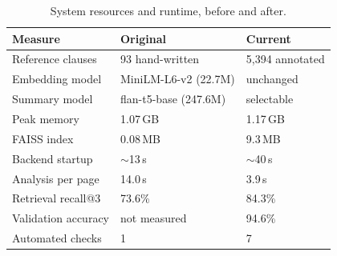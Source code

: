 \begin{table}[!t]
\centering
\caption{System resources and runtime, before and after.}
\label{tab:resources}
\footnotesize
\begin{tabular}{lll}
\toprule
Measure & Original & Current \\
\midrule
Reference clauses & 93 hand-written & 5,394 annotated \\
Embedding model & MiniLM-L6-v2 (22.7M) & unchanged \\
Summary model & flan-t5-base (247.6M) & selectable \\
Peak memory & 1.07\,GB & 1.17\,GB \\
FAISS index & 0.08\,MB & 9.3\,MB \\
Backend startup & $\sim$13\,s & $\sim$40\,s \\
Analysis per page & 14.0\,s & 3.9\,s \\
Retrieval recall@3 & 73.6\% & 84.3\% \\
Validation accuracy & not measured & 94.6\% \\
Automated checks & 1 & 7 \\
\bottomrule
\end{tabular}
\end{table}
